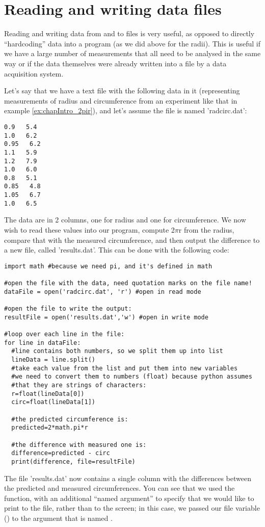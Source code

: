 \section{Reading and writing data files}
Reading and writing data from and to files is very useful, as opposed to directly ``hardcoding'' data into a program (as we did above for the radii). This is useful if we have a large number of measurements that all need to be analysed in the same way or if the data themselves were already written into a file by a data acquisition system.

Let's say that we have a text file with the following data in it (representing measurements of radius and circumference from an experiment like that in example \ref{ex:chapIntro_2pir}), and let's assume the file is named 'radcirc.dat':
\begin{verbatim}
0.9   5.4
1.0   6.2
0.95   6.2
1.1   5.9
1.2   7.9
1.0   6.0
0.8   5.1
0.85   4.8
1.05   6.7
1.0   6.5
\end{verbatim}
The data are in 2 columns, one for radius and one for circumference. We now wish to read these values into our program, compute 2$\pi$r from the radius, compare that with the measured circumference, and then output the difference to a new file, called 'results.dat'. This can be done with the following code:
\begin{lstlisting}[frame=single] 
import math #because we need pi, and it's defined in math

#open the file with the data, need quotation marks on the file name!
dataFile = open('radcirc.dat', 'r') #open in read mode

#open the file to write the output:
resultFile = open('results.dat','w') #open in write mode

#loop over each line in the file:
for line in dataFile:
  #line contains both numbers, so we split them up into list
  lineData = line.split()
  #take each value from the list and put them into new variables
  #we need to convert them to numbers (float) because python assumes
  #that they are strings of characters:
  r=float(lineData[0])
  circ=float(lineData[1])
  
  #the predicted circumference is:
  predicted=2*math.pi*r
  
  #the difference with measured one is:
  difference=predicted - circ
  print(difference, file=resultFile)

\end{lstlisting}
The file 'results.dat' now contains a single column with the differences between the predicted and measured circumferences. You can see that we used the  function, with an additional ``named argument'' to specify that we would like to print to the file, rather than to the screen; in this case, we passed our file variable () to the argument that is named .


